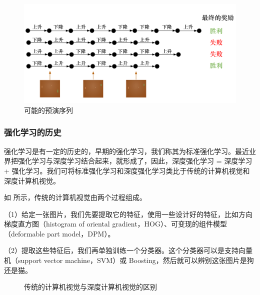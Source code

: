 \begin{figure}[htb]
    \centering
    \includegraphics[width=0.7\linewidth]{res/ch1/1.13}
    \caption{可能的预演序列}
    \label{fig:rollout_seq}
\end{figure}

\subsubsection{强化学习的历史}
强化学习是有一定的历史的，早期的强化学习，我们称其为标准强化学习。最近业界把强化学习与深度学习结合起来，就形成了，因此，深度强化学习 = 深度学习 + 强化学习。我们可将标准强化学习和深度强化学习类比于传统的计算机视觉和深度计算机视觉。

如 所示，传统的计算机视觉由两个过程组成。

（1）给定一张图片，我们先要提取它的特征，使用一些设计好的特征，比如方向梯度直方图（histogram of oriental gradient，HOG）、可变现的组件模型（deformable part model，DPM）。

（2）提取这些特征后，我们再单独训练一个分类器。这个分类器可以是支持向量机（support vector machine，SVM）或 Boosting，然后就可以辨别这张图片是狗还是猫。 

\begin{figure}[htb]
    \centering

    \caption{传统的计算机视觉与深度计算机视觉的区别}
    \label{fig:cmp_vis}
\end{figure}

